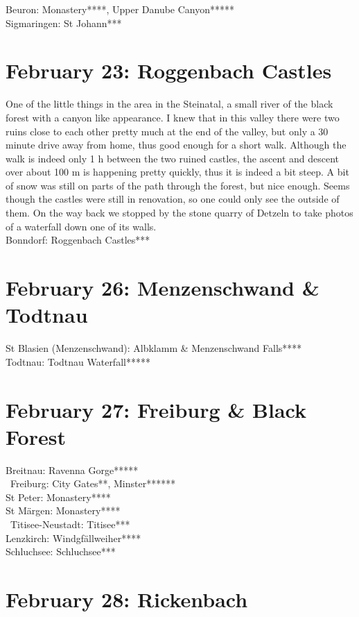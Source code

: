 Beuron: Monastery****, Upper Danube Canyon*****\\
Sigmaringen: St Johann***

\section{February 23: Roggenbach Castles}
\label{2021:Roggenbach}

One of the little things in the area in the Steinatal, a small river of the black forest with a canyon like appearance. I knew that in this valley there were two ruins close to each other pretty much at the end of the valley, but only a 30 minute drive away from home, thus good enough for a short walk. Although the walk is indeed only 1 h between the two ruined castles, the ascent and descent over about 100 m is happening pretty quickly, thus it is indeed a bit steep. A bit of snow was still on parts of the path through the forest, but nice enough. Seems though the castles were still in renovation, so one could only see the outside of them. On the way back we stopped by the stone quarry of Detzeln to take photos of a waterfall down one of its walls.\\

Bonndorf: Roggenbach Castles***

\section{February 26: Menzenschwand \& Todtnau}
\label{2021:Todtnau}

St Blasien (Menzenschwand): Albklamm \& Menzenschwand Falls****\\
Todtnau: Todtnau Waterfall*****

\section{February 27: Freiburg \& Black Forest}
\label{2021:Freiburg}

Breitnau: Ravenna Gorge*****\\\
Freiburg: City Gates**, Minster******\\
St Peter: Monastery****\\
St M\"argen: Monastery****\\\
Titisee-Neustadt: Titisee***\\
Lenzkirch: Windgf\"allweiher****\\
Schluchsee: Schluchsee***

\section{February 28: Rickenbach}
\label{2021:Rickenbach}

